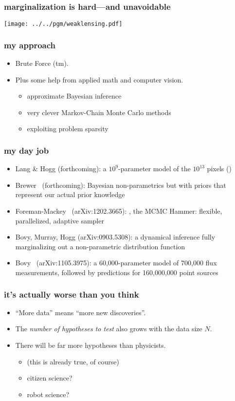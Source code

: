 \documentclass[pdftex]{beamer}
\begin{document}
\begin{frame}
  \frametitle{marginalization is hard---and unavoidable}
  \texttt{[image: ../../pgm/weaklensing.pdf]}
\end{frame}

\begin{frame}
  \frametitle{my approach}
  \begin{itemize}
  \item<1-> Brute Force (tm).
  \item<2-> Plus some help from applied math and computer vision.
    \begin{itemize}
    \item approximate Bayesian inference
    \item very clever Markov-Chain Monte Carlo methods
    \item exploiting problem sparsity
    \end{itemize}
  \end{itemize}
\end{frame}

\begin{frame}
  \frametitle{my day job}
  \begin{itemize}
  \item Lang \& Hogg {\small(forthcoming)}: a $10^9$-parameter model of the
    $10^{13}$  pixels ()
  \item Brewer \etal\ {\small(forthcoming)}: Bayesian non-parametrics but with
    priors that represent our actual prior knowledge
  \item Foreman-Mackey \etal\ {\small(arXiv:1202.3665)}:
    , the MCMC Hammer: flexible, parallelized, adaptive
    sampler
  \item Bovy, Murray, Hogg {\small(arXiv:0903.5308)}: a dynamical inference
    fully marginalizing out a non-parametric distribution function
  \item Bovy \etal\ {\small(arXiv:1105.3975)}: a 60,000-parameter model of
    700,000 flux measurements, followed by predictions for 160,000,000
    point sources
  \end{itemize}
\end{frame}

\begin{frame}
  \frametitle{it's actually worse than you think}
  \begin{itemize}
  \item ``More data'' means ``more new discoveries''.
  \item The \emph{number of hypotheses to test} also grows with the data size $N$.
  \item There will be far more hypotheses than physicists.
    \begin{itemize}
    \item (this is already true, of course)
    \item citizen science?
    \item robot science?
    \end{itemize}
  \end{itemize}
\end{frame}
\end{document}
